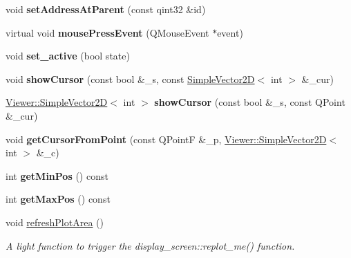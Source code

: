 \begin{DoxyCompactItemize}
\item 
\mbox{\label{classdisplay__screen__container_ade0146a0c568c4c4ed12dec01dabd7ef}} 
void {\bfseries set\+Address\+At\+Parent} (const qint32 \&id)
\item 
\mbox{\label{classdisplay__screen__container_a1da8af8c20ea964d082e6e31a8a331f8}} 
virtual void {\bfseries mouse\+Press\+Event} (Q\+Mouse\+Event $\ast$event)
\item 
\mbox{\label{classdisplay__screen__container_afb58d6b90622e4f2f949cb76237a0c73}} 
void {\bfseries set\+\_\+active} (bool state)
\item 
\mbox{\label{classdisplay__screen__container_a42b1b96f4d570e1e87566855dfec5898}} 
void {\bfseries show\+Cursor} (const bool \&\+\_\+s, const \mbox{\hyperlink{classViewer_1_1SimpleVector2D}{Simple\+Vector2D}}$<$ int $>$ \&\+\_\+cur)
\item 
\mbox{\label{classdisplay__screen__container_a335935ef0bd82f657fe47cb14d93bf96}} 
\mbox{\hyperlink{classViewer_1_1SimpleVector2D}{Viewer\+::\+Simple\+Vector2D}}$<$ int $>$ {\bfseries show\+Cursor} (const bool \&\+\_\+s, const Q\+Point \&\+\_\+cur)
\item 
\mbox{\label{classdisplay__screen__container_aac3a1d389e38542d1a1437af139baa30}} 
void {\bfseries get\+Cursor\+From\+Point} (const Q\+PointF \&\+\_\+p, \mbox{\hyperlink{classViewer_1_1SimpleVector2D}{Viewer\+::\+Simple\+Vector2D}}$<$ int $>$ \&\+\_\+c)
\item 
\mbox{\label{classdisplay__screen__container_ae6ade785282dec1d7096bf922230e363}} 
int {\bfseries get\+Min\+Pos} () const
\item 
\mbox{\label{classdisplay__screen__container_a1ae765f62dce67082596a45dcc4f75bf}} 
int {\bfseries get\+Max\+Pos} () const
\item 
\mbox{\label{classdisplay__screen__container_a4a5a6823fd38e46a780268d0b380012c}} 
void \mbox{\hyperlink{classdisplay__screen__container_a4a5a6823fd38e46a780268d0b380012c}{refresh\+Plot\+Area}} ()
\begin{DoxyCompactList}\small\item\em A light function to trigger the display\+\_\+screen\+::replot\+\_\+me() function. \end{DoxyCompactList}\end{DoxyCompactItemize}
